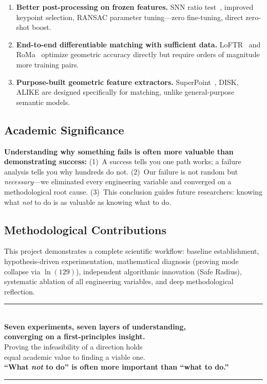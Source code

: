 \documentclass[11pt,a4paper]{article}
\begin{document}
\begin{enumerate}
    \item \textbf{Better post-processing on frozen features.} SNN ratio test~\cite{superglue}, improved keypoint selection, RANSAC parameter tuning---zero fine-tuning, direct zero-shot boost.
    \item \textbf{End-to-end differentiable matching with sufficient data.} LoFTR~\cite{loftr} and RoMa~\cite{roma} optimize geometric accuracy directly but require orders of magnitude more training pairs.
    \item \textbf{Purpose-built geometric feature extractors.} SuperPoint~\cite{superpoint}, DISK, ALIKE are designed specifically for matching, unlike general-purpose semantic models.
\end{enumerate}

\subsection{Academic Significance}

\textbf{Understanding why something fails is often more valuable than demonstrating success:} (1)~A success tells you one path works; a failure analysis tells you why hundreds do not. (2)~Our failure is not random but \emph{necessary}---we eliminated every engineering variable and converged on a methodological root cause. (3)~This conclusion guides future researchers: knowing what \emph{not} to do is as valuable as knowing what to do.

\subsection{Methodological Contributions}

This project demonstrates a complete scientific workflow: baseline establishment, hypothesis-driven experimentation, mathematical diagnosis (proving mode collapse via $\ln(129)$), independent algorithmic innovation (Safe Radius), systematic ablation of all engineering variables, and deep methodological reflection.

\begin{center}
\rule{0.45\textwidth}{0.4pt}\\[12pt]
{\large\bfseries Seven experiments, seven layers of understanding,\\[2pt]
converging on a first-principles insight.}\\[10pt]
{\large Proving the infeasibility of a direction holds\\[2pt]
equal academic value to finding a viable one.}\\[10pt]
{\large\color{red!70!black}\bfseries``What \emph{not} to do'' is often more important than ``what to do.''}\\[12pt]
\rule{0.45\textwidth}{0.4pt}
\end{center}
\end{document}
